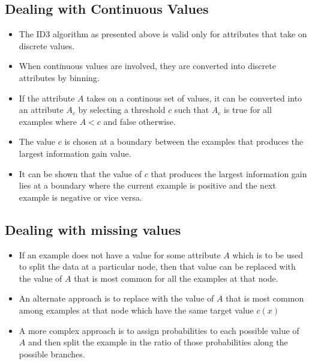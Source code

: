 \documentclass{article}
\theoremstyle{plain}
\theoremstyle{definition}
\begin{document}
\subsection{Dealing with Continuous Values}
\begin{itemize}
    \item The ID3 algorithm as presented above is valid only for attributes that take on discrete values.
    
    \item When continuous values are involved, they are converted into discrete attributes by binning.
    
    \item If the attribute $A$ takes on a continous set of values, it can be converted into an attribute $A_c$ by selecting a threshold $c$ such that $A_c$ is true for all examples where $A < c$ and false otherwise. 
    
    \item The value $c$ is chosen at a boundary between the examples that produces the largest information gain value.
    
    \item It can be shown that the value of $c$ that produces the largest information gain lies at a boundary where the current example is positive and the next example is negative or vice versa. 
\end{itemize}

\subsection{Dealing with missing values}
\begin{itemize}
    \item If an example does not have a value for some attribute $A$ which is to be used to split the data at a particular node, then that value can be replaced with the value of $A$ that is most common for all the examples at that node.
    
    \item An alternate approach is to replace with the value of $A$ that is most common among examples at that node which have the same target value $c(x)$
    
    \item A more complex approach is to assign probabilities to each possible value of $A$ and then split the example in the ratio of those probabilities along the possible branches.
\end{itemize}
\end{document}
